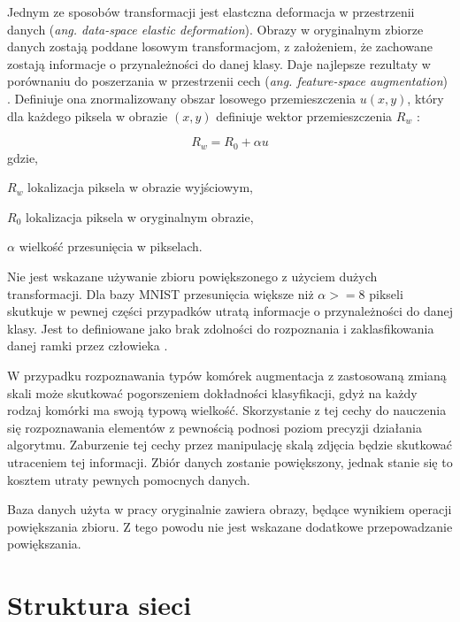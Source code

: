 Jednym ze sposobów transformacji jest elastczna deformacja w przestrzenii danych (\textit{ang. data-space elastic deformation}). Obrazy w oryginalnym zbiorze danych zostają poddane losowym transformacjom, z założeniem, że zachowane zostają informacje o przynależności do danej klasy. Daje najlepsze rezultaty w porównaniu do poszerzania w przestrzenii cech (\textit{ang. feature-space augmentation}) \cite{Wong2016UnderstandingDA}. Definiuje ona znormalizowany obszar losowego przemieszczenia \(u(x,y)\), który dla każdego piksela w obrazie \((x,y)\) definiuje wektor przemieszczenia \(R_w\) \cite{Wong2016UnderstandingDA}:

\begin{equation}
R_w = R_0 + \alpha u
\end{equation}
gdzie,
\begin{eqwhere}[2cm]
	\item[$R_w$] lokalizacja piksela w obrazie wyjściowym,
	\item[$R_0$] lokalizacja piksela w oryginalnym obrazie,
	\item[$\alpha$] wielkość przesunięcia w pikselach.
\end{eqwhere}

Nie jest wskazane używanie zbioru powiększonego z użyciem dużych transformacji. Dla bazy MNIST przesunięcia większe niż \(\alpha >= 8\) pikseli skutkuje w pewnej części przypadków utratą informacje o przynależności do danej klasy. Jest to definiowane jako brak zdolności do rozpoznania i zaklasfikowania danej ramki przez człowieka \cite{Wong2016UnderstandingDA}.

W przypadku rozpoznawania typów komórek augmentacja z zastosowaną zmianą skali może skutkować pogorszeniem dokładności klasyfikacji, gdyż na każdy rodzaj komórki ma swoją typową wielkość. Skorzystanie z tej cechy do nauczenia się rozpoznawania elementów z pewnością podnosi poziom precyzji działania algorytmu. Zaburzenie tej cechy przez manipulację skalą zdjęcia będzie skutkować utraceniem tej informacji. Zbiór danych zostanie powiększony, jednak stanie się to kosztem utraty pewnych pomocnych danych.

Baza danych użyta w pracy oryginalnie zawiera obrazy, będące wynikiem operacji powiększania zbioru. Z tego powodu nie jest wskazane dodatkowe przepowadzanie powiększania.

\section{Struktura sieci}

